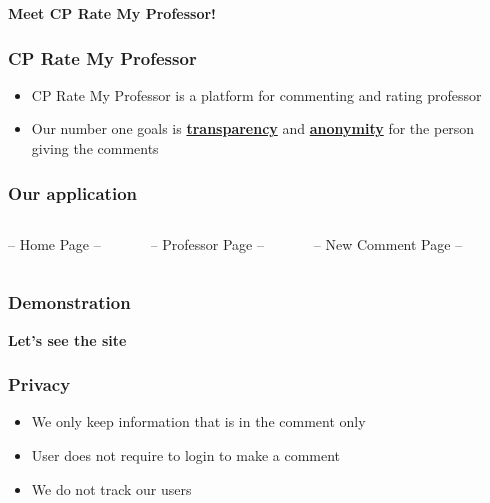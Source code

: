 \documentclass[aspectratio=169]{beamer}
\begin{document}
\begin{frame}
\begin{columns}
\begin{column}{0.4\textwidth}
        \end{column}
    \end{columns}
\end{frame}
\begin{frame}
    \centering
    {\huge \textbf{Meet CP Rate My Professor!}}
\end{frame}
\begin{frame}
    \frametitle{CP Rate My Professor}
    \begin{itemize}
        \pause
        \item CP Rate My Professor is a platform for commenting and rating professor\pause
        \item Our number one goals is \underline{\textbf{transparency}} and \underline{\textbf{anonymity}} for the person giving the comments
    \end{itemize}
\end{frame}
\begin{frame}
    \frametitle{Our application}
    \begin{center}
        \begin{columns}
            \begin{column}{0.3\textwidth}
                \centering
                -- Home Page --
            \end{column}
            \begin{column}{0.3\textwidth}
                \centering
                -- Professor Page --

            \end{column}
            \centering
            -- New Comment Page --
            \begin{column}{0.3\textwidth}

            \end{column}
        \end{columns}
    \end{center}
\end{frame}
\begin{frame}
    \frametitle{Demonstration}
    \centering
    {\huge\textbf{Let's see the site}}
\end{frame}
\begin{frame}
    \frametitle{Privacy}
    \begin{itemize}
        \item We only keep information that is in the comment only
        \item User does not require to login to make a comment
        \item We do not track our users
    \end{itemize}
\end{frame}
\end{document}
